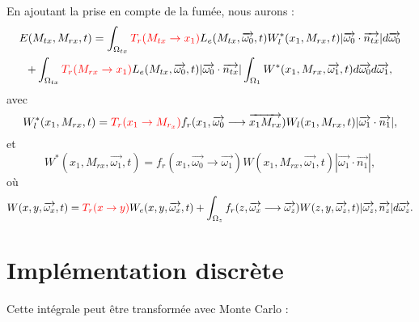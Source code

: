 En ajoutant la prise en compte de la fumée, nous aurons :
\large \begin{multline}
    E(M_{tx}, M_{rx}, t) =
        \int_{\Omega_{tx}}
            \textcolor{red}{T_r(M_{tx} \rightarrow x_1)}
            L_e(M_{tx}, \overrightarrow{\omega_0}, t)
            W_l^*(x_1, M_{rx}, t)
            | \overrightarrow{\omega_0} \cdot \overrightarrow{n_{tx}} |
            d\overrightarrow{\omega_0}
        \\ +
        \int_{\Omega_{tx}}
            \textcolor{red}{T_r(M_{rx} \rightarrow x_1)}
            L_e(M_{tx}, \overrightarrow{\omega_0}, t)
            | \overrightarrow{\omega_0} \cdot \overrightarrow{n_{tx}} |
            \int_{\Omega_1}
                W^*(x_1, M_{rx}, \overrightarrow{\omega_1}, t)
            d\overrightarrow{\omega_0}
        d\overrightarrow{\omega_1}
,\end{multline} \normalsize
avec
\large \begin{equation*}
    W_l^*(x_1, M_{rx}, t) =
        \textcolor{red}{T_r(x_1 \rightarrow M_{r_x})}
        f_r(x_1, \overrightarrow{\omega_0} \longrightarrow \overrightarrow{x_1 M_{rx}})
        W_l(x_1, M_{rx}, t)
        | \overrightarrow{\omega_1} \cdot \overrightarrow{n_1} |
,\end{equation*} \normalsize
et
\large \begin{equation*}
    W^*(x_1, M_{rx}, \overrightarrow{\omega_1}, t) = 
        f_r(x_1, \overrightarrow{\omega_0} \longrightarrow \overrightarrow{\omega_1})
        W(x_1, M_{rx}, \overrightarrow{\omega_1}, t)
        | \overrightarrow{\omega_1} \cdot \overrightarrow{n_1} |
,\end{equation*} \normalsize
où
\large \begin{equation*}
    W(x, y, \overrightarrow{\omega_x}, t) =
        \textcolor{red}{T_r(x \rightarrow y)}
        W_e(x, y, \overrightarrow{\omega_x}, t) +
        \int_{\Omega_z}
            f_r(z, \overrightarrow{\omega_x} \longrightarrow \overrightarrow{\omega_z})
            W(z, y, \overrightarrow{\omega_z}, t)
            |\overrightarrow{\omega_z}, \overrightarrow{n_z} |
        d\overrightarrow{\omega_z}
.\end{equation*} \normalsize

\section{Implémentation discrète}

Cette intégrale peut être transformée avec Monte Carlo :

